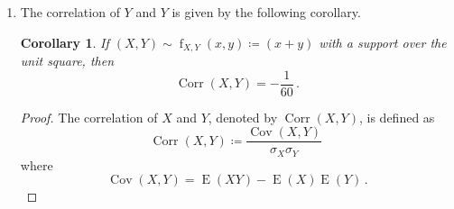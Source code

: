 \documentclass[10pt]{fphw}
\newtheorem{corollary}{Corollary}
\newcommand{\var}{\operatorname{Var}}
\newcommand{\expect}{\operatorname{E}}
\newcommand{\corr}{\operatorname{Corr}}
\newcommand{\cov}{\operatorname{Cov}}
\newcommand{\eval}[3]{\left. #1 \right\vert_{#2}^{#3}}
\begin{document}
\begin{enumerate}
\begin{proof}
	By theorem~\ref{thm:EX_VX_EXY}, $\expect(X) = 7/12$.
    $\expect(X^2)$ is given by
	\begin{equation}
    \label{eq:expectX2}
	\begin{split}
		\expect(X^2)
			&= \int_{0}^{1} x^2 \left(x+\frac{1}{2}\right) \mathrm{d}x\\
			&=\eval{\frac{x^4}{4}}{0}{1} + \eval{\frac{x^3}{6}}{0}{1} = \frac{5}{12}\,.
	\end{split}
	\end{equation}
	Thus,
	\begin{equation*}
		\var(X) = \frac{5}{12} - \left(\frac{7}{12}\right)^2 = \frac{11}{144}\,.
	\end{equation*}
	
	The expectation of $X Y$ is given by
	\begin{equation*}
	\begin{split}
		\expect(X Y)
			&\coloneqq \int_{0}^{1} \int_{0}^{1} x y \operatorname{f}_{X,Y}(x,y) \mathrm{d}x \mathrm{d}y\\
			&= \int_{0}^{1} \int_{0}^{1} x y (x+y) \mathrm{d}x \mathrm{d}y\\
			&= \int_{0}^{1} y \int_{0}^{1} x^2 \mathrm{d}x \mathrm{d}y + \int_{0}^{1} y^2 \int_{0}^{1} x \mathrm{d}x \mathrm{d}y = \frac{1}{3}\,.
	\end{split}
	\end{equation*}
    \end{proof}
	
	\item The correlation of $Y$ and $Y$ is given by the following corollary.    
    \begin{corollary}
    \label{cor:corrXY}	
    If $(X,Y) \sim \operatorname{f}_{X,Y}(x,y) \coloneqq (x+y)$ with a support over the unit square, then
    \begin{equation}
        \corr(X,Y) = -\frac{1}{60}\,.
    \end{equation}
    \end{corollary}
    \begin{proof}
    The correlation of $X$ and $Y$, denoted by $\corr(X,Y)$, is defined as
	\begin{equation}
		\corr(X,Y) \coloneqq \frac{\cov(X,Y)}{\sigma_X \sigma_Y}\
	\end{equation}
	where
	\begin{equation*}
		\cov(X,Y) = \expect(X Y) - \expect(X) \expect(Y)\,.
	\end{equation*}
	

\end{proof}
\end{enumerate}
\end{document}
